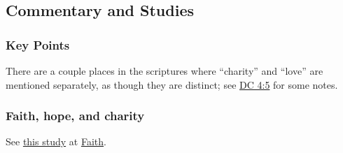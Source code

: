 	
	
	
	
\subsection{Commentary and Studies} %
	\label{CHARITY-COMMENTARY}

	\subsubsection{Key Points}
		\label{CHARITY-KEYS}
	
		\begin{compactitem}
			\item There are a couple places in the scriptures where ``charity'' and ``love'' are mentioned separately, as though they are distinct; see \hyperref[DC4-5]{DC 4:5} for some notes.
		\end{compactitem}
		
	\subsubsection{Faith, hope, and charity}
	
		See \hyperref[FAITH-hope-charity]{this study} at \hyperref[FAITH]{Faith}.
		
